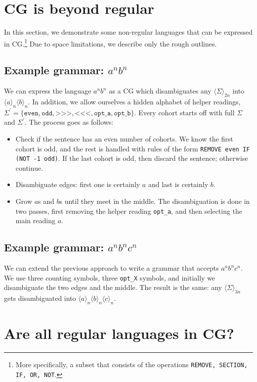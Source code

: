 \documentclass[11pt]{article}
\def\t#1{\texttt{#1}}
\def\maxAmb#1{$\langle \Sigma \rangle_#1$}
\def\maxAmbCFG#1{$\langle \Sigma,\Sigma^{\prime} \rangle_#1$}
\begin{document}
\section{CG is beyond regular}

In this section, we demonstrate some non-regular languages 
that can be expressed in CG.\footnote{More specifically, a subset that consists of
the operations \t{REMOVE, SECTION, IF, OR, NOT}.}
Due to space limitations, we describe only the rough outlines.

\subsection{Example grammar: $a^nb^n$ }

We can express the language $a^nb^n$ as a CG which disambiguates
any \maxAmb{{2n}} into $\langle a \rangle_n \langle b \rangle_n$.
In addition, we allow ourselves a hidden alphabet of helper readings, 
$\Sigma^{\prime} = \{\t{even}, \t{odd}, \t{>>>}, \t{<<<}, \t{opt\_a}, \t{opt\_b}\}$. 
Every cohort starts off with full $\Sigma$ and $\Sigma^{\prime}$.
The process goes as follows:
\begin{itemize}
\item Check if the sentence has an even number of cohorts. We know the first cohort
      is odd, and the rest is handled with rules of the form \t{REMOVE even IF (NOT -1 odd)}.
      If the last cohort is odd, then discard the sentence; otherwise continue.
\item Disambiguate edges: first one is certainly $a$ and last is certainly $b$.
\item Grow $a$s and $b$s until they meet in the middle. The disambiguation is done in two 
      passes, first removing the helper reading \t{opt\_a}, and then selecting the main reading $a$.
\end{itemize}

\subsection{Example grammar: $a^nb^nc^n$}

We can extend the previous approach to write a grammar that accepts $a^nb^nc^n$.
We use three counting symbols, three \t{opt\_X} symbols, and initially we disambiguate
the two edges and the middle. The result is the same: any \maxAmb{{3n}} gets disambiguated
into $\langle a \rangle_n \langle b \rangle_n \langle c \rangle_n$.


\section{Are all regular languages in CG?}
\end{document}
